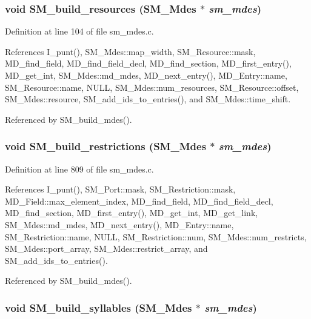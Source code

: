 \subsubsection{\setlength{\rightskip}{0pt plus 5cm}void SM\_\-build\_\-resources (\bf{SM\_\-Mdes} $\ast$ {\em sm\_\-mdes})}\label{sm__mdes_8c_f3c40b1fee8b4c6daa1ad4682a1f830d}




Definition at line 104 of file sm\_\-mdes.c.

References I\_\-punt(), SM\_\-Mdes::map\_\-width, SM\_\-Resource::mask, MD\_\-find\_\-field, MD\_\-find\_\-field\_\-decl, MD\_\-find\_\-section, MD\_\-first\_\-entry(), MD\_\-get\_\-int, SM\_\-Mdes::md\_\-mdes, MD\_\-next\_\-entry(), MD\_\-Entry::name, SM\_\-Resource::name, NULL, SM\_\-Mdes::num\_\-resources, SM\_\-Resource::offset, SM\_\-Mdes::resource, SM\_\-add\_\-ids\_\-to\_\-entries(), and SM\_\-Mdes::time\_\-shift.

Referenced by SM\_\-build\_\-mdes().
\subsubsection{\setlength{\rightskip}{0pt plus 5cm}void SM\_\-build\_\-restrictions (\bf{SM\_\-Mdes} $\ast$ {\em sm\_\-mdes})}\label{sm__mdes_8c_cabe1e3171719ce7c801fd3ba8036980}




Definition at line 809 of file sm\_\-mdes.c.

References I\_\-punt(), SM\_\-Port::mask, SM\_\-Restriction::mask, MD\_\-Field::max\_\-element\_\-index, MD\_\-find\_\-field, MD\_\-find\_\-field\_\-decl, MD\_\-find\_\-section, MD\_\-first\_\-entry(), MD\_\-get\_\-int, MD\_\-get\_\-link, SM\_\-Mdes::md\_\-mdes, MD\_\-next\_\-entry(), MD\_\-Entry::name, SM\_\-Restriction::name, NULL, SM\_\-Restriction::num, SM\_\-Mdes::num\_\-restricts, SM\_\-Mdes::port\_\-array, SM\_\-Mdes::restrict\_\-array, and SM\_\-add\_\-ids\_\-to\_\-entries().

Referenced by SM\_\-build\_\-mdes().
\subsubsection{\setlength{\rightskip}{0pt plus 5cm}void SM\_\-build\_\-syllables (\bf{SM\_\-Mdes} $\ast$ {\em sm\_\-mdes})}\label{sm__mdes_8c_b5c9896da6b3cc808361174e581e5536}




